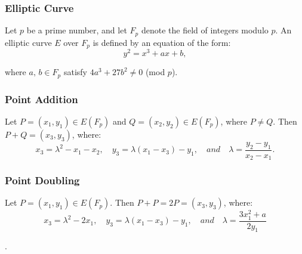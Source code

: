 \documentclass[12pt,a4paper]{article}
\begin{document}
\subsubsection{Elliptic Curve} \noindent \label{Elliptic Curve}
Let $p$ be a prime number, and let $F_p$ denote the field of integers modulo $p$. 
An elliptic curve $E$ over $F_p$ is defined by an equation of the form:
\begin{equation}
y^2 = x^3 + ax + b,
\end{equation}

where $a,\, b \in F_p$ satisfy $4a^3 + 27b^2 \ne 0$ (mod $ p$).

\subsubsection{Point Addition} \noindent \label{Point Addition}
Let $P = (x_1,y_1) \in E(F_p)$ and $Q = (x_2,y_2) \in E(F_p)$, where $P \neq Q$. 
Then $P + Q = (x_3,y_3)$, where:
\begin{equation}
    x_3 = \lambda^2 - x_1 - x_2, \quad y_3 = \lambda(x_1 - x_3) - y_1, \quad and \quad \lambda = \frac{y_2-y_1}{x_2-x_1}.
\end{equation}

\subsubsection{Point Doubling} \noindent \label{Point Doubling}
Let $P = (x_1,y_1) \in E(F_p)$. 
Then $P + P = 2P = (x_3,y_3)$, where:
\begin{equation}
    x_3 = \lambda^2 - 2x_1, \quad y_3 = \lambda(x_1 - x_3) - y_1, \quad and \quad \lambda = \frac{3x_1^2 + a}{2y_1}
\end{equation}

\cite{hankerson2003guide,lopez2000overview}.

\vspace{5mm}
\end{document}
